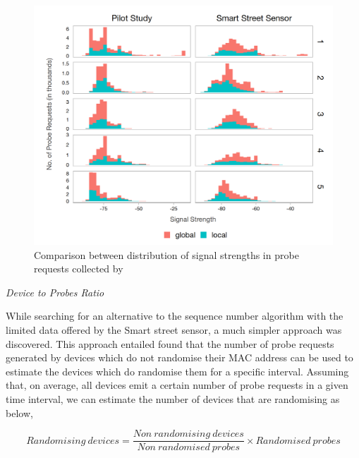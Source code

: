 \begin{figure}
  \includegraphics[trim={5 5 5 5}, clip]{images/processing-sss-signalsnew.png}
  \caption{Comparison between distribution of signal strengths in probe requests collected by }
  \label{figure:processing:sss:signals}
\end{figure}

\vspace{1.5em}\noindent\textit{Device to Probes Ratio}\vspace{0.5em}

While searching for an alternative to the sequence number algorithm with the limited data offered by the Smart street sensor, a much simpler approach was discovered.
This approach entailed found that the number of probe requests generated by devices which do not randomise their MAC address can be used to estimate the devices which do randomise them for a specific interval.
Assuming that, on average, all devices emit a certain number of probe requests in a given time interval, we can estimate the number of devices that are randomising as below,

\[Randomising\ devices = \frac{Non\ randomising\ devices}{Non\ randomised\ probes}\times{Randomised\ probes}\]

